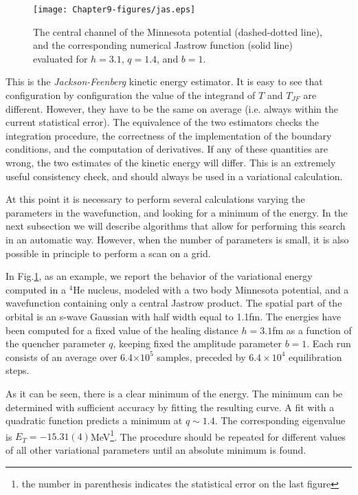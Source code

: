 \begin{figure}
	\begin{center}
		\texttt{[image: Chapter9-figures/jas.eps]}
	\end{center}
	\caption{The central channel of the Minnesota potential (dashed-dotted line), and the corresponding numerical Jastrow function (solid line) evaluated for $h=3.1$, $q=1.4$, and $b=1$.}
	\label{fig.var}
\end{figure}
This is the {\it Jackson-Feenberg} kinetic energy estimator. It is easy to see that configuration by configuration the value of the integrand of $T$ and $T_{JF}$ are different. However, they have to be the same on average (i.e. always within the current statistical error). The equivalence of the two estimators checks the integration procedure, the correctness of the implementation of the boundary conditions, and the computation of derivatives. If any of these quantities are wrong, the two estimates of the kinetic energy will differ. This is an extremely useful consistency check, and should always be used in a variational calculation.

At this point it is necessary to perform several calculations varying the parameters in the wavefunction, and looking for a minimum of the energy. In the next subsection we will describe algorithms that allow for performing this search in an automatic way. However, when the number of parameters is small, it is also possible in principle to perform a scan on a grid. 

In Fig.\ref{fig.var}, as an example, we report the behavior of the variational energy computed in a $^4$He nucleus, modeled with a two body Minnesota potential, and a wavefunction containing only a central Jastrow product. The spatial part of the orbital is an s-wave Gaussian with half width equal to 1.1fm. The energies have been computed for a fixed value of the healing distance $h=3.1$fm as a function of the quencher parameter $q$, keeping fixed the amplitude parameter $b=1$. Each run consists of an average over 6.4$\times 10^5$ samples, preceded by $6.4\times 10^4$ equilibration steps. 

As it can be seen, there is a clear minimum of the energy. 
The minimum can be determined with sufficient accuracy by fitting the resulting curve. A fit with a quadratic function predicts a minimum at $q\sim1.4$. The corresponding eigenvalue is $E_T=-15.31(4)$MeV\footnote{the number in parenthesis indicates the statistical error on the last figure}. The procedure should be repeated for different values of all other variational parameters until an absolute minimum is found. 


